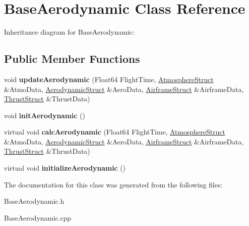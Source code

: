 \hypertarget{class_base_aerodynamic}{}\section{Base\+Aerodynamic Class Reference}
\label{class_base_aerodynamic}


Inheritance diagram for Base\+Aerodynamic\+:
\subsection*{Public Member Functions}
\begin{DoxyCompactItemize}
\item 
\mbox{\label{class_base_aerodynamic_a6354f3c8433c7a2235041f843d4fe10e}} 
void {\bfseries update\+Aerodynamic} (Float64 Flight\+Time, \hyperlink{group___data_cloud_struct_atmosphere_struct}{Atmosphere\+Struct} \&Atmo\+Data, \hyperlink{group___data_cloud_struct_aerodynamic_struct}{Aerodynamic\+Struct} \&Aero\+Data, \hyperlink{group___data_cloud_struct_airframe_struct}{Airframe\+Struct} \&Airframe\+Data, \hyperlink{group___data_cloud_struct_thrust_struct}{Thrust\+Struct} \&Thrust\+Data)
\item 
\mbox{\label{class_base_aerodynamic_aaeebe11ae40e87069a13256d1de4f1bb}} 
void {\bfseries init\+Aerodynamic} ()
\item 
\mbox{\label{class_base_aerodynamic_a2a2d641c761198459eba1719d6ea78e9}} 
virtual void {\bfseries calc\+Aerodynamic} (Float64 Flight\+Time, \hyperlink{group___data_cloud_struct_atmosphere_struct}{Atmosphere\+Struct} \&Atmo\+Data, \hyperlink{group___data_cloud_struct_aerodynamic_struct}{Aerodynamic\+Struct} \&Aero\+Data, \hyperlink{group___data_cloud_struct_airframe_struct}{Airframe\+Struct} \&Airframe\+Data, \hyperlink{group___data_cloud_struct_thrust_struct}{Thrust\+Struct} \&Thrust\+Data)
\item 
\mbox{\label{class_base_aerodynamic_a3f141372283dab543e7f26359daa0310}} 
virtual void {\bfseries initialize\+Aerodynamic} ()
\end{DoxyCompactItemize}


The documentation for this class was generated from the following files\+:\begin{DoxyCompactItemize}
\item 
Base\+Aerodynamic.\+h\item 
Base\+Aerodynamic.\+cpp\end{DoxyCompactItemize}
